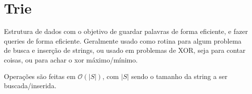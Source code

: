 \section{Trie}
Estrutura de dados com o objetivo de guardar palavras de forma eficiente, e fazer queries de forma eficiente. Geralmente usado como rotina para algum problema de busca e inserção de strings, ou usado em problemas de XOR, seja para contar coisas, ou para achar o xor máximo/mínimo.

Operações são feitas em $\mathcal{O}(|S|)$, com $|S|$ sendo o tamanho da string a ser buscada/inserida.

